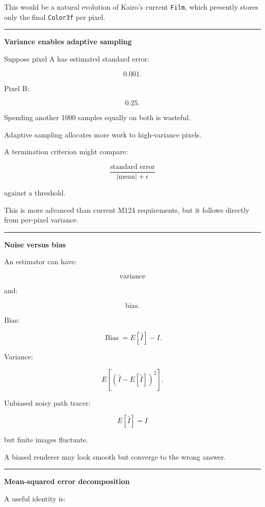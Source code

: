 This would be a natural evolution of Kairo's current \texttt{Film}, which presently stores only the final \texttt{Color3f} per pixel.

\begin{center}\rule{0.5\linewidth}{0.5pt}\end{center}

\textbf{Variance enables adaptive sampling}

Suppose pixel A has estimated standard error:

\[
0.001.
\]

Pixel B:

\[
0.25.
\]

Spending another 1000 samples equally on both is wasteful.

Adaptive sampling allocates more work to high-variance pixels.

A termination criterion might compare:

\[
\frac{
\text{standard error}
}{
|\text{mean}|+\epsilon
}
\]

against a threshold.

This is more advanced than current M124 requirements, but it follows directly from per-pixel variance.

\begin{center}\rule{0.5\linewidth}{0.5pt}\end{center}

\textbf{Noise versus bias}

An estimator can have:

\[
\text{variance}
\]

and:

\[
\text{bias}.
\]

Bias:

\[
\boxed{
\operatorname{Bias}
=
E[\hat I]-I.
}
\]

Variance:

\[
\boxed{
E[
(\hat I-E[\hat I])^2
].
}
\]

Unbiased noisy path tracer:

\[
E[\hat I]=I
\]

but finite images fluctuate.

A biased renderer may look smooth but converge to the wrong answer.

\begin{center}\rule{0.5\linewidth}{0.5pt}\end{center}

\textbf{Mean-squared error decomposition}

A useful identity is:

